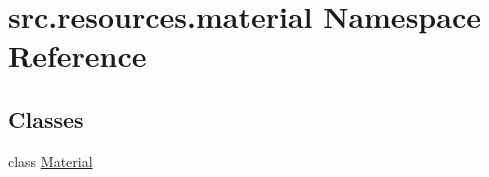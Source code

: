 \hypertarget{namespacesrc_1_1resources_1_1material}{\section{src.\+resources.\+material Namespace Reference}
\label{namespacesrc_1_1resources_1_1material}
}
\subsection*{Classes}
\begin{DoxyCompactItemize}
\item 
class \hyperlink{classsrc_1_1resources_1_1material_1_1_material}{Material}
\end{DoxyCompactItemize}
